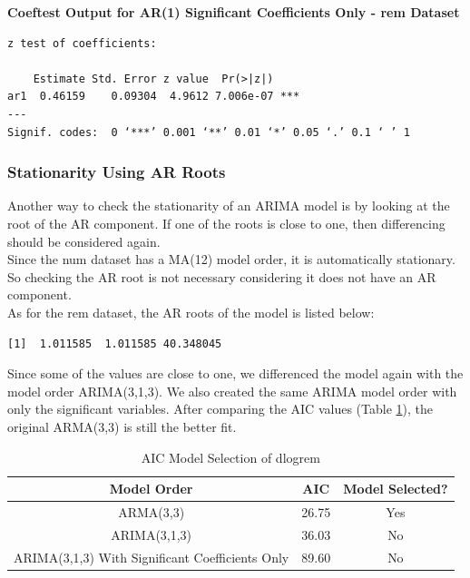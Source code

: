 \documentclass[a4paper]{article}
\begin{document}
\textbf{Coeftest Output for AR(1) Significant Coefficients Only - rem Dataset}

\begin{verbatim}
z test of coefficients:

    Estimate Std. Error z value  Pr(>|z|)    
ar1  0.46159    0.09304  4.9612 7.006e-07 ***
---
Signif. codes:  0 ‘***’ 0.001 ‘**’ 0.01 ‘*’ 0.05 ‘.’ 0.1 ‘ ’ 1
\end{verbatim}

\subsubsection{Stationarity Using AR Roots}
Another way to check the stationarity of an ARIMA model is by looking at the root of the AR component. If one of the roots is close to one, then differencing should be considered again. \\

Since the num dataset has a MA(12) model order, it is automatically stationary. So checking the AR root is not necessary considering it does not have an AR component. \\

As for the rem dataset, the AR roots of the model is listed below:

\begin{verbatim}
[1]  1.011585  1.011585 40.348045
\end{verbatim}

Since some of the values are close to one, we differenced the model again with the model order ARIMA(3,1,3). We also created the same ARIMA model order with only the significant variables. After comparing the AIC values (Table \ref{tab:aic3}), the original ARMA(3,3) is still the better fit.

\begin{table}[h!]
    \centering
    \caption{AIC Model Selection of dlogrem}
    \begin{tabular}{|c|c|c|}
    \hline
    Model Order & AIC & Model Selected? \\
    \hline
    ARMA(3,3) & 26.75 & Yes \\ 
    \hline
    ARIMA(3,1,3) & 36.03 & No \\
    \hline
    ARIMA(3,1,3) With Significant Coefficients Only & 89.60 & No \\
    \hline
    \end{tabular}
    \label{tab:aic3}
\end{table}
\end{document}
